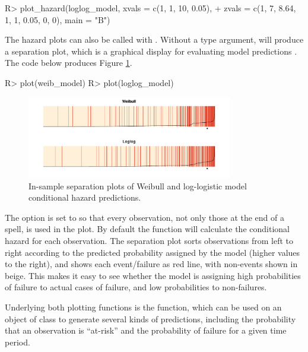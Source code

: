 \documentclass[article]{jss}
\begin{document}
\begin{CodeChunk}
\begin{CodeInput}
R> plot_hazard(loglog_model, xvals = c(1, 1, 10, 0.05), 
+    zvals = c(1, 7, 8.64, 1, 1, 0.05, 0, 0), main = "B")
\end{CodeInput}
\end{CodeChunk}

The hazard plots can also be called with
. Without a type argument,
 will produce a separation plot, which is a graphical
display for evaluating model predictions \citep{greenhill2011separation}. The code below produces Figure \ref{insamp}.

\begin{CodeChunk}
\begin{CodeInput}
R> plot(weib_model)
R> plot(loglog_model)
\end{CodeInput}
\end{CodeChunk}

\begin{figure}
\begin{center}
\includegraphics[width=0.8\textwidth]{graphics/sepplots.pdf}
\caption{In-sample separation plots of Weibull and log-logistic model conditional hazard predictions.}
\label{insamp}
\end{center}
\end{figure}

The option  is set to  so that every
observation, not only those at the end of a spell, is used in the plot.
By default the  function will calculate the conditional
hazard for each observation. The separation plot sorts observations from
left to right according to the predicted probability assigned by the
model (higher values to the right), and shows each event/failure as red
line, with non-events shown in beige. This makes it easy to see whether
the model is assigning high probabilities of failure to actual cases of
failure, and low probabilities to non-failures.

Underlying both plotting functions is the  function, which
can be used on an object of class  to generate several kinds
of predictions, including the probability that an observation is
``at-risk'' and the probability of failure for a given time period.
\end{document}
